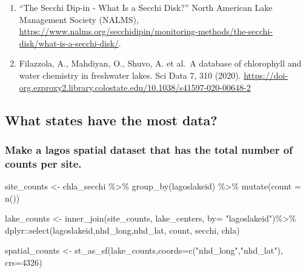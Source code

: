 \documentclass[
]{book}
\newenvironment{Shaded}{\begin{snugshade}}{\end{snugshade}}
\newcommand{\AttributeTok}[1]{\textcolor[rgb]{0.77,0.63,0.00}{#1}}
\newcommand{\DecValTok}[1]{\textcolor[rgb]{0.00,0.00,0.81}{#1}}
\newcommand{\FunctionTok}[1]{\textcolor[rgb]{0.00,0.00,0.00}{#1}}
\newcommand{\NormalTok}[1]{#1}
\newcommand{\OtherTok}[1]{\textcolor[rgb]{0.56,0.35,0.01}{#1}}
\newcommand{\SpecialCharTok}[1]{\textcolor[rgb]{0.00,0.00,0.00}{#1}}
\newcommand{\StringTok}[1]{\textcolor[rgb]{0.31,0.60,0.02}{#1}}
\begin{document}
\begin{enumerate}
\def\labelenumi{\arabic{enumi}.}
\item
  ``The Secchi Dip-in - What Is a Secchi Disk?'' North American Lake Management Society (NALMS),
  \url{https://www.nalms.org/secchidipin/monitoring-methods/the-secchi-disk/what-is-a-secchi-disk/}.
\item
  Filazzola, A., Mahdiyan, O., Shuvo, A. et al.~A database of chlorophyll and water chemistry in freshwater lakes. Sci Data 7, 310 (2020).
  \url{https://doi-org.ezproxy2.library.colostate.edu/10.1038/s41597-020-00648-2}
\end{enumerate}

\hypertarget{what-states-have-the-most-data}{%
\subsection{What states have the most data?}\label{what-states-have-the-most-data}}

\hypertarget{make-a-lagos-spatial-dataset-that-has-the-total-number-of-counts-per-site.}{%
\subsubsection{Make a lagos spatial dataset that has the total number of counts per site.}\label{make-a-lagos-spatial-dataset-that-has-the-total-number-of-counts-per-site.}}

\begin{Shaded}
\begin{Highlighting}[]
\NormalTok{site\_counts }\OtherTok{\textless{}{-}}\NormalTok{ chla\_secchi }\SpecialCharTok{\%\textgreater{}\%}
  \FunctionTok{group\_by}\NormalTok{(lagoslakeid) }\SpecialCharTok{\%\textgreater{}\%}
  \FunctionTok{mutate}\NormalTok{(}\AttributeTok{count =} \FunctionTok{n}\NormalTok{())}

\NormalTok{lake\_counts }\OtherTok{\textless{}{-}} \FunctionTok{inner\_join}\NormalTok{(site\_counts, lake\_centers, }\AttributeTok{by=} \StringTok{"lagoslakeid"}\NormalTok{)}\SpecialCharTok{\%\textgreater{}\%} 
\NormalTok{  dplyr}\SpecialCharTok{::}\FunctionTok{select}\NormalTok{(lagoslakeid,nhd\_long,nhd\_lat, count, secchi, chla)}

\NormalTok{spatial\_counts }\OtherTok{\textless{}{-}} \FunctionTok{st\_as\_sf}\NormalTok{(lake\_counts,}\AttributeTok{coords=}\FunctionTok{c}\NormalTok{(}\StringTok{"nhd\_long"}\NormalTok{,}\StringTok{"nhd\_lat"}\NormalTok{),}
                          \AttributeTok{crs=}\DecValTok{4326}\NormalTok{)}
\end{Highlighting}
\end{Shaded}
\end{document}
